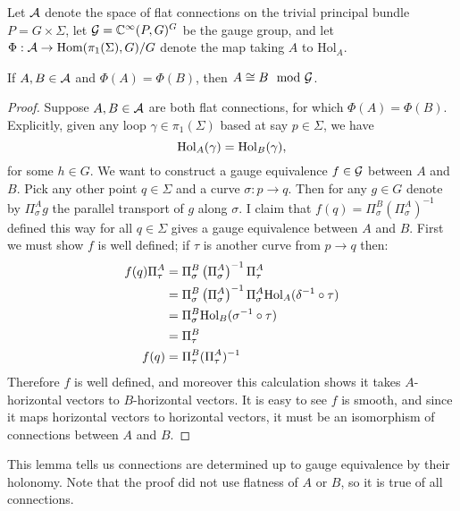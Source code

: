 	Let $\mathcal{A}$ denote the space of flat connections on the trivial principal bundle $P=G\times \Sigma$, let $\mathcal{G} = \mathbb{C}^\infty(P, G)^G$ be the gauge group, and let $\Phi:\mathcal{A} \to \text{Hom}(\pi_1(\Sigma),G)/G$ denote the map taking $A$ to $\text{Hol}_A$. 
	\begin{lemma}
		If $A,B\in \mathcal{A}$ and $\Phi(A) = \Phi(B)$, then $A \cong B \mod {\mathcal{G}}$.
	\end{lemma}
	\begin{proof}
		Suppose $A,B\in \mathcal{A}$ are both flat connections, for which $\Phi(A) = \Phi(B)$. Explicitly, given any loop $\gamma\in \pi_1(\Sigma)$ based at say $p\in \Sigma$, we have 
		\begin{equation*}
			\text{Hol}_A(\gamma) = \text{Hol}_B(\gamma), 
		\end{equation*}
		for some $h\in G$. We want to construct a gauge equivalence $f\in \mathcal{G}$ between $A$ and $B$. Pick any other point $q\in \Sigma$ and a curve $\sigma:p\to q$. Then for any $g\in G$ denote by $\Pi_\sigma^Ag$ the parallel transport of $g$ along $\sigma$. I claim that $f(q) = \Pi_\sigma^B\left(\Pi_\sigma^A\right)^{-1}$ defined this way for all $q\in \Sigma$ gives a gauge equivalence between $A$ and $B$. First we must show $f$ is well defined; if $\tau$ is another curve from $p\to q$ then:
		\begin{align*}
			f(q)\Pi_\tau^A &= \Pi_\sigma^B\left(\Pi_\sigma^A\right)^{-1}\Pi_\tau^A\\
			&= \Pi_\sigma^B\left(\Pi_\sigma^A\right)^{-1}\Pi_\sigma^A\text{Hol}_A(\delta^{-1}\circ \tau)\\
			&= \Pi_\sigma^B \text{Hol}_B(\sigma^{-1}\circ \tau)\\
			&= \Pi_\tau^B\\
			f(q) &= \Pi_\tau^B (\Pi_\tau^A)^{-1}
		\end{align*}
		Therefore $f$ is well defined, and moreover this calculation shows it takes $A$-horizontal vectors to $B$-horizontal vectors. It is easy to see $f$ is smooth, and since it maps horizontal vectors to horizontal vectors, it must be an isomorphism of connections between $A$ and $B$. 
	\end{proof}
	This lemma tells us connections are determined up to gauge equivalence by their holonomy. Note that the proof did not use flatness of $A$ or $B$, so it is true of all connections. 
	
